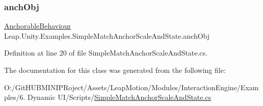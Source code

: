 \subsubsection{\texorpdfstring{anchObj}{anchObj}}
{\footnotesize\ttfamily \mbox{\hyperlink{class_leap_1_1_unity_1_1_interaction_1_1_anchorable_behaviour}{Anchorable\+Behaviour}} Leap.\+Unity.\+Examples.\+Simple\+Match\+Anchor\+Scale\+And\+State.\+anch\+Obj}



Definition at line 20 of file Simple\+Match\+Anchor\+Scale\+And\+State.\+cs.



The documentation for this class was generated from the following file\+:\begin{DoxyCompactItemize}
\item 
O\+:/\+Git\+H\+U\+B\+M\+I\+N\+I\+P\+Roject/\+Assets/\+Leap\+Motion/\+Modules/\+Interaction\+Engine/\+Examples/6. Dynamic U\+I/\+Scripts/\mbox{\hyperlink{_simple_match_anchor_scale_and_state_8cs}{Simple\+Match\+Anchor\+Scale\+And\+State.\+cs}}\end{DoxyCompactItemize}
